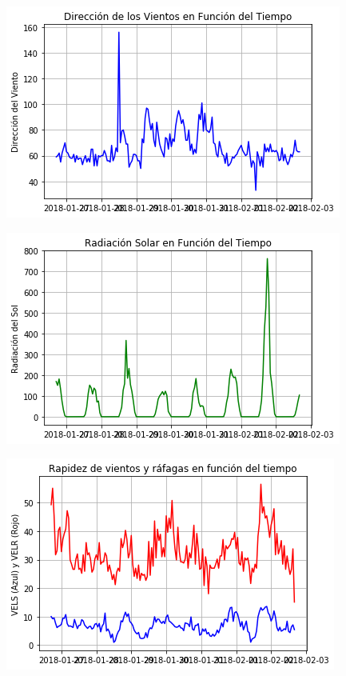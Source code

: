 \documentclass{article}
\begin{document}
\begin{figure}[h!]
    \centering
    \includegraphics[width=\linewidth]{dv_vs_t.png}
\end{figure}

\begin{figure}[h!]
    \centering
    \includegraphics[width=\linewidth]{rs_vs_t.png}
\end{figure}

\begin{figure}[h!]
    \centering
    \includegraphics[width=\linewidth]{rvrr_vs_t.png}
\end{figure}
\end{document}
